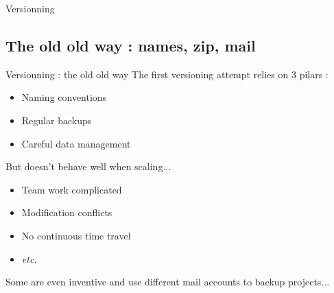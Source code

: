\documentclass[10pt]{beamer}
\begin{document}
\begin{frame}{Versionning} %
	\begin{center}

	\end{center}
\end{frame}


\subsection{The old old way : names, zip, mail} %

\begin{frame}{Versionning : the old old way} %
	The first versioning attempt relies on 3 pilars :

	\begin{itemize}
		\item Naming conventions
		\item Regular backups
		\item Careful data management
	\end{itemize}

	But doesn't behave well when scaling...

	\begin{itemize}
		\item Team work complicated
		\item Modification conflicts
		\item No continuous time travel
		\item \textit{etc.}
	\end{itemize}

	Some are even inventive and use different mail accounts to backup projects...
\end{frame}
\end{document}
